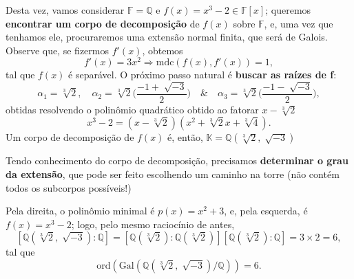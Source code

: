 \documentclass[../algebraIII_notes.tex]{subfiles}
\begin{document}
\begin{example}
	Desta vez, vamos considerar \(\mathbb{F} = \mathbb{Q}\) e \(f(x)=x^{3}-2\in \mathbb{F}[x]\); queremos \textbf{encontrar um corpo de decomposição} de \(f(x)\) sobre \(\mathbb{F}\), e, uma vez que tenhamos ele, procuraremos uma extensão normal finita, que será de Galois.
	Observe que, se fizermos \(f'(x)\), obtemos
	\[
		f'(x) = 3x^{2} \Rightarrow \mathrm{mdc}(f(x), f'(x))=1,
	\]
	tal que \(f(x)\) é separável. O próximo passo natural é \textbf{buscar as raízes de f}:
	\[
		\alpha_1 = \sqrt[3]{2}, \quad \alpha_2 = \sqrt[3]{2}\biggl(\frac{-1+\sqrt[]{-3}}{2}\biggr) \quad\&\quad \alpha_3 = \sqrt[3]{2}\biggl(\frac{-1-\sqrt[]{-3}}{2}\biggr),
	\]
	obtidas resolvendo o polinômio quadrático obtido ao fatorar \(x-\sqrt[3]{2}\)
	\[
		x^{3}-2 = (x-\sqrt[3]{2})(x^{2}+\sqrt[3]{2}x + \sqrt[3]{4}).
	\]
	Um corpo de decomposição de \(f(x)\) é, então, \(\mathbb{K} = \mathbb{Q}(\sqrt[3]{2}, \sqrt[]{-3})\)

	Tendo conhecimento do corpo de decomposição, precisamos \textbf{determinar o grau da extensão}, que pode ser feito escolhendo um caminho na torre (não contém todos os subcorpos possíveis!)
	\begin{center}
	\end{center}
	Pela direita, o polinômio minimal é \(p(x) = x^{2}+3\), e, pela esquerda, é \(f(x)=x^{3}-2\); logo, pelo mesmo raciocínio de antes,
	\[
		[\mathbb{Q}(\sqrt[3]{2}, \sqrt[]{-3}):\mathbb{Q}]=[\mathbb{Q}(\sqrt[3]{2}):\mathbb{Q}(\sqrt[3]{2})][\mathbb{Q}(\sqrt[3]{2}):\mathbb{Q}]=3 \times 2 = 6,
	\]
	tal que
	\[
		\mathrm{ord}(\mathrm{Gal}(\mathbb{Q}(\sqrt[3]{2}, \sqrt[]{-3})/\mathbb{Q}))=6.
	\]


\end{example}
\end{document}
